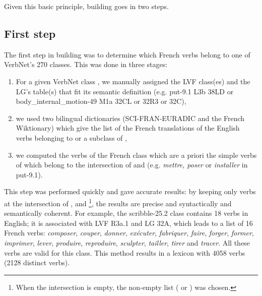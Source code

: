 Given this basic principle, building \verbenet{} goes in two steps.

\subsection{First step}\label{first}

The first step in building \verbenet{} was to determine which French verbs
belong to one of  VerbNet's 270 classes. This was done in three stages:

\begin{enumerate}

    \item For a given VerbNet class \Ce{}, we  manually assigned the LVF class(es)
    \Clvf{} and the LG's table(s) \Clg{} that fit its semantic definition (e.g.
    {\color{blue}put-9.1} {\color{red}L3b} {\color{green}38LD} or
    {\color{blue}body\_internal\_motion-49} {\color{red}M1a} {\color{green}32CL or
    32R3 or 32C}),

    \item we used two bilingual dictionaries (SCI-FRAN-EURADIC and the French
    Wiktionary) which give the list \Ltrad{} of the French translations of the
    English verbs belonging to \Ce{} or a subclass of \Ce{},

    \item we computed the verbs of the French class \Cf{} which are a priori the
    simple verbs of \Ltrad{} which belong to the intersection of \Clvf{} and \Clg{}
    (e.g. \emph{mettre, poser} or \emph{installer} in {\color{blue}put-9.1}).

\end{enumerate}

This step was performed quickly and gave accurate results: by keeping only
verbs at the intersection of \Ltrad{}, \Clvf{} and \Clg{}\footnote{When the
intersection is empty, the non-empty list (\Clvf{} or \Clg{}) was chosen.}, the
results are precise and syntactically and semantically coherent. For example,
the {\color{blue}scribble-25.2} class contains 18 verbs in English; it is
associated with LVF {\color{red}R3a.1} and LG {\color{green}32A},  which leads to a
list of 16 French verbs: \emph{composer}, \emph{couper}, \emph{donner},
\emph{exécuter}, \emph{fabriquer}, \emph{faire}, \emph{forger}, \emph{former},
\emph{imprimer}, \emph{lever}, \emph{produire}, \emph{reproduire},
\emph{sculpter}, \emph{tailler}, \emph{tirer} and \emph{tracer}. All these
verbs are valid for this class.  This method results in a lexicon with 4058
verbs (2128 distinct verbs).

